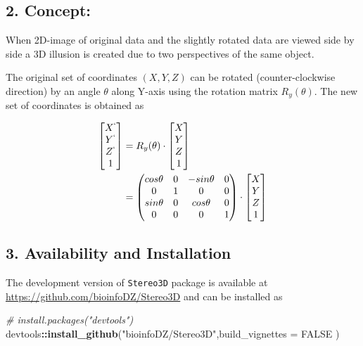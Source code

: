 \documentclass[]{article}
\newenvironment{Shaded}{\begin{snugshade}}{\end{snugshade}}
\newcommand{\KeywordTok}[1]{\textcolor[rgb]{0.13,0.29,0.53}{\textbf{#1}}}
\newcommand{\DataTypeTok}[1]{\textcolor[rgb]{0.13,0.29,0.53}{#1}}
\newcommand{\StringTok}[1]{\textcolor[rgb]{0.31,0.60,0.02}{#1}}
\newcommand{\CommentTok}[1]{\textcolor[rgb]{0.56,0.35,0.01}{\textit{#1}}}
\newcommand{\OtherTok}[1]{\textcolor[rgb]{0.56,0.35,0.01}{#1}}
\newcommand{\OperatorTok}[1]{\textcolor[rgb]{0.81,0.36,0.00}{\textbf{#1}}}
\newcommand{\NormalTok}[1]{#1}
\begin{document}
\subsection{2. Concept:}\label{concept}

When 2D-image of original data and the slightly rotated data are viewed
side by side a 3D illusion is created due to two perspectives of the
same object.

The original set of coordinates \((X, Y, Z)\) can be rotated
(counter-clockwise direction) by an angle \(\theta\) along Y-axis using
the rotation matrix \(R_y (\theta)\). The new set of coordinates is
obtained as

\[
\begin{aligned}
\begin{bmatrix}
X^` \\ Y^` \\ Z^` \\ 1
\end{bmatrix}  & =
R_y (\theta) \cdot
\begin{bmatrix}
X \\ Y \\ Z \\ 1
\end{bmatrix}  \\
& =
\begin{pmatrix}
cos \theta & 0 & -sin \theta & 0\\
0 & 1 & 0 & 0\\
sin \theta & 0 & cos \theta & 0\\
0 & 0 & 0 & 1
\end{pmatrix} \cdot
\begin{bmatrix}
X \\ Y \\ Z \\ 1
\end{bmatrix}
\end{aligned}
\]

\subsection{3. Availability and
Installation}\label{availability-and-installation}

The development version of \texttt{Stereo3D} package is available at
\url{https://github.com/bioinfoDZ/Stereo3D} and can be installed as

\begin{Shaded}
\begin{Highlighting}[]
\CommentTok{# install.packages("devtools")}
\NormalTok{devtools}\OperatorTok{::}\KeywordTok{install_github}\NormalTok{(}\StringTok{"bioinfoDZ/Stereo3D"}\NormalTok{,}\DataTypeTok{build_vignettes =} \OtherTok{FALSE}\NormalTok{ )}
\end{Highlighting}
\end{Shaded}
\end{document}
